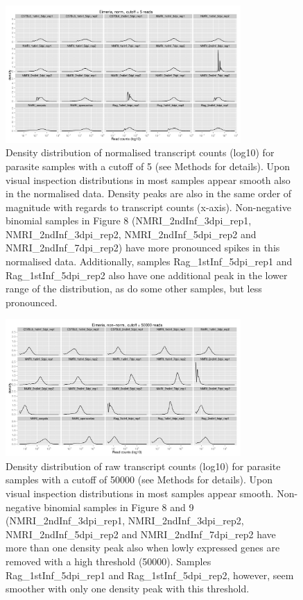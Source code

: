 \documentclass{article}
\begin{document}
\begin{figure}[h]
\begin{center}
\includegraphics[width=0.8\textwidth]{distributions_Efnorm5}
\caption{Density distribution of normalised transcript counts (log10)
  for parasite samples with a cutoff of 5 (see Methods for
  details). Upon visual inspection distributions in most samples
  appear smooth also in the normalised data. Density peaks are also in
  the same order of magnitude with regards to transcript counts
  (x-axis). Non-negative binomial samples in Figure 8
  (NMRI\_2ndInf\_3dpi\_rep1, NMRI\_2ndInf\_3dpi\_rep2,
  NMRI\_2ndInf\_5dpi\_rep2 and NMRI\_2ndInf\_7dpi\_rep2) have more
  pronounced spikes in this normalised data. Additionally, samples
  Rag\_1stInf\_5dpi\_rep1 and Rag\_1stInf\_5dpi\_rep2 also have one
  additional peak in the lower range of the distribution, as do some
  other samples, but less pronounced.}
\end{center}
\end{figure}

\begin{figure}[h]
\begin{center}
\includegraphics[width=0.8\textwidth]{distributions_Ef50000}
\caption{Density distribution of raw transcript counts (log10) for
  parasite samples with a cutoff of 50000 (see Methods for
  details). Upon visual inspection distributions in most samples
  appear smooth. Non-negative binomial samples in Figure 8 and 9
  (NMRI\_2ndInf\_3dpi\_rep1, NMRI\_2ndInf\_3dpi\_rep2,
  NMRI\_2ndInf\_5dpi\_rep2 and NMRI\_2ndInf\_7dpi\_rep2 have more than
  one density peak also when lowly expressed genes are removed with a
  high threshold (50000). Samples Rag\_1stInf\_5dpi\_rep1 and
  Rag\_1stInf\_5dpi\_rep2, however, seem smoother with only one
  density peak with this threshold.}
\end{center}
\end{figure}
\end{document}
